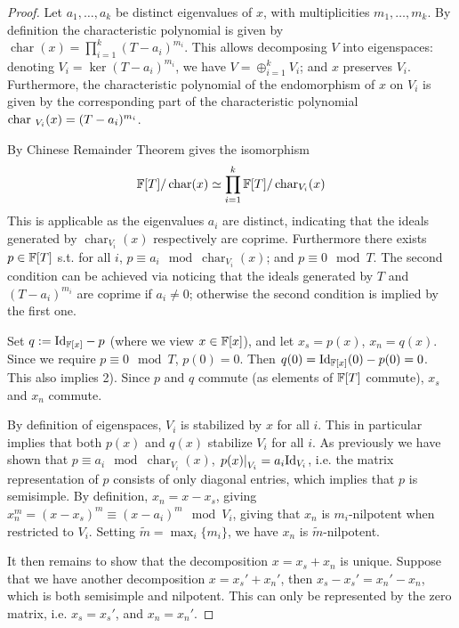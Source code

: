 \documentclass{article}
\begin{document}
\begin{proof}
    Let $a_1, \dots, a_k$ be distinct eigenvalues of $x$, with multiplicities $m_1, \dots, m_k$. By definition the characteristic polynomial is given by $\operatorname{char}(x) = \prod_{i = 1}^k (T - a_i)^{m_i}$. This allows decomposing $V$ into eigenspaces: denoting $V_i = \ker (T - a_i)^{m_i}$, we have $V = \oplus_{i = 1}^k V_i$; and $x$ preserves $V_i$. Furthermore, the characteristic polynomial of the endomorphism of $x$ on $V_i$ is given by the corresponding part of the characteristic polynomial $\mathrm{char}\ _{V_i}(x) = (T - a_i)^{m_i}$.

    By Chinese Remainder Theorem gives the isomorphism
    \[
        \mathbb{F}[T]/\operatorname{char}(x) \simeq \prod_{i = 1}^k \mathbb{F}[T]/\operatorname{char}_{V_i}(x)
    \]
    This is applicable as the eigenvalues $a_i$ are distinct, indicating that the ideals generated by $\operatorname{char}_{V_i}(x)$ respectively are coprime. Furthermore there exists $p \in \mathbb{F}[T]$ s.t. for all $i$, $p \equiv a_i \mod{\operatorname{char}_{V_i}(x)}$; and $p \equiv 0 \mod{T}$. The second condition can be achieved via noticing that the ideals generated by $T$ and $(T - a_i)^{m_i}$ are coprime if $a_i \neq 0$; otherwise the second condition is implied by the first one. 

    Set $q := \mathrm{Id}_{\mathbb{F}[x]} - p$ (where we view $x \in \mathbb{F}[x]$), and let $x_s = p(x)$, $x_n = q(x)$. Since we require $p \equiv 0 \mod{T}$, $p(0) = 0$. Then $q(0) = \mathrm{Id}_{\mathbb{F}[x]}(0) - p(0) = 0$. This also implies 2). Since $p$ and $q$ commute (as elements of $\mathbb{F}[T]$ commute), $x_s$ and $x_n$ commute. 
    
    By definition of eigenspaces, $V_i$ is stabilized by $x$ for all $i$. This in particular implies that both $p(x)$ and $q(x)$ stabilize $V_i$ for all $i$. As previously we have shown that $p \equiv a_i \mod{\operatorname{char}_{V_i}(x)}$, $\left.p(x)\right|_{V_i} = a_i \mathrm{Id}_{V_i}$, i.e. the matrix representation of $p$ consists of only diagonal entries, which implies that $p$ is semisimple. By definition, $x_n = x - x_s$, giving $x_n^m = (x - x_s)^m \equiv (x - a_i)^m \mod{V_i}$, giving that $x_n$ is $m_i$-nilpotent when restricted to $V_i$. Setting $\widetilde{m} = \max_i \{ m_i \}$, we have $x_n$ is $\widetilde{m}$-nilpotent. 

    It then remains to show that the decomposition $x = x_s + x_n$ is unique. Suppose that we have another decomposition $x = x_s' + x_n'$, then $x_s - x_s' = x_n' - x_n$, which is both semisimple and nilpotent. This can only be represented by the zero matrix, i.e. $x_s = x_s'$, and $x_n = x_n'$.
\end{proof}
\end{document}
